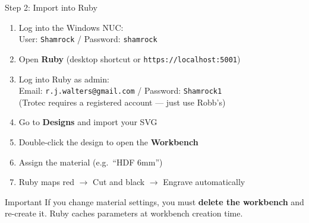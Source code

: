\documentclass[aspectratio=169]{beamer}
\begin{document}
\begin{frame}{Step 2: Import into Ruby}
\begin{enumerate}
    \item Log into the Windows NUC:\\
        {\small User: \texttt{Shamrock} / Password: \texttt{shamrock}}
    \item Open \textbf{Ruby} (desktop shortcut or \texttt{https://localhost:5001})
    \item Log into Ruby as admin:\\
        {\small Email: \texttt{r.j.walters@gmail.com} / Password: \texttt{Shamrock1}}\\
        {\small (Trotec requires a registered account --- just use Robb's)}
    \item Go to \textbf{Designs} and import your SVG
    \item Double-click the design to open the \textbf{Workbench}
    \item Assign the material (e.g.\ ``HDF 6mm'')
    \item Ruby maps red $\to$ Cut and black $\to$ Engrave automatically
\end{enumerate}

\vspace{0.5em}
\begin{alertblock}{Important}
If you change material settings, you must \textbf{delete the workbench}
and re-create it. Ruby caches parameters at workbench creation time.
\end{alertblock}
\end{frame}
\end{document}
